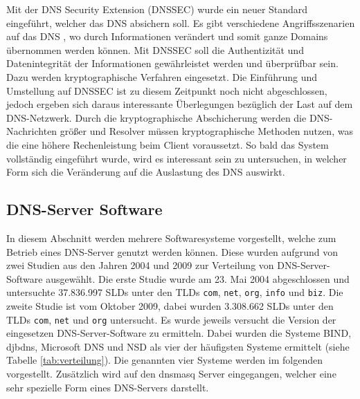 \documentclass[a4paper, 12pt, BCOR10mm, DIV12, toc=bibliography, toc=listof, german]{scrbook}
\begin{document}
				Mit der DNS Security Extension (DNSSEC) \cite{rfc4033,rfc4034,rfc4035,liualb2006} wurde ein
				neuer Standard eingeführt, welcher das DNS absichern soll. Es gibt verschiedene
				Angriffsszenarien auf das DNS \cite{lorenz2012}, wo durch Informationen verändert und somit
				ganze Domains übernommen werden können. Mit DNSSEC soll die Authentizität und
				Datenintegrität der Informationen gewährleistet werden und überprüfbar sein. Dazu werden
				kryptographische Verfahren eingesetzt. Die Einführung und Umstellung auf DNSSEC ist zu
				diesem Zeitpunkt noch nicht abgeschlossen, jedoch ergeben sich daraus interessante
				Überlegungen bezüglich der Last auf dem DNS-Netzwerk. Durch die kryptographische
				Abschicherung werden die DNS-Nachrichten größer und Resolver müssen kryptographische
				Methoden nutzen, was die eine höhere Rechenleistung beim Client voraussetzt. So bald das
				System vollständig eingeführt wurde, wird es interessant sein zu untersuchen, in welcher
				Form sich die Veränderung auf die Auslastung des DNS auswirkt.



			\subsection{DNS-Server Software} %
			\label{sub:software}
			
				In diesem Abschnitt werden mehrere Softwaresysteme vorgestellt, welche zum Betrieb eines
				DNS-Server genutzt werden können. Diese wurden aufgrund von zwei Studien aus den Jahren 2004
				und 2009 zur Verteilung von DNS-Server-Software ausgewählt. Die erste Studie
				\cite{survey2004} wurde am 23. Mai 2004 abgeschlossen und untersuchte 37.836.997 SLDs unter
				den TLDs \texttt{com}, \texttt{net}, \texttt{org},	\texttt{info} und \texttt{biz}. Die
				zweite Studie \cite{survey2009} ist vom Oktober 2009, dabei wurden 3.308.662 SLDs unter den
				TLDs \texttt{com}, \texttt{net} und \texttt{org} untersucht. Es wurde jeweils versucht die
				Version der eingesetzen DNS-Server-Software zu ermitteln. Dabei wurden die Systeme BIND,
				djbdns, Microsoft DNS und NSD als vier der häufigsten Systeme ermittelt (siehe Tabelle
				\ref{tab:verteilung}). Die genannten vier Systeme werden im folgenden vorgestellt.
				Zusätzlich wird auf den dnsmasq Server eingegangen, welcher eine sehr spezielle Form eines
				DNS-Servers darstellt.
				
\end{document}
